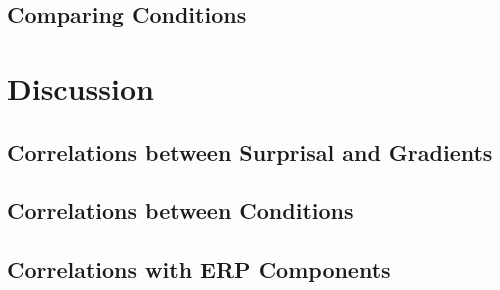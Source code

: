 \documentclass{IEEEtran}
\begin{document}
\subsection{Comparing Conditions}

\section{Discussion}
\subsection{Correlations between Surprisal and Gradients}


\subsection{Correlations between Conditions}


\subsection{Correlations with ERP Components}

\end{document}
